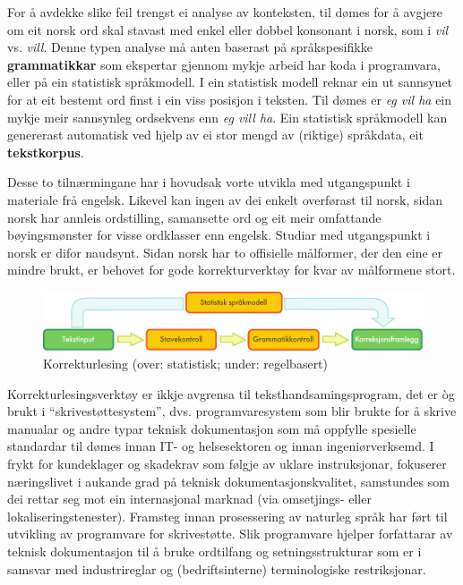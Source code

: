 \begin{multicols}{2}
For å avdekke slike feil trengst ei analyse av konteksten, til dømes for å avgjere om eit norsk ord skal stavast med enkel eller dobbel konsonant i norsk, som i \textit{vil} vs. \textit{vill}.
Denne typen analyse må anten baserast på språkspesifikke \textbf{grammatikkar} som ekspertar gjennom mykje arbeid har koda i programvara, eller på ein statistisk språkmodell. 
I ein statistisk modell reknar ein ut sannsynet for at eit bestemt ord finst i ein viss posisjon i teksten. Til dømes er \textit{eg vil ha} ein mykje meir sannsynleg ordsekvens enn \textit{eg vill ha}. Ein statistisk språkmodell kan genererast automatisk ved hjelp av ei stor mengd av (riktige) språkdata, eit \textbf{tekstkorpus}. 

Desse to tilnærmingane har i hovudsak vorte utvikla med utgangspunkt i materiale frå engelsk. Likevel kan ingen av dei enkelt overførast til norsk, sidan norsk har annleis ordstilling, samansette ord og eit meir omfattande bøyingsmønster for visse ordklasser enn engelsk. Studiar med utgangspunkt i norsk er difor naudsynt. Sidan norsk har to offisielle målformer, der den eine er mindre brukt, er behovet for gode korrekturverktøy for kvar av målformene stort. 

\begin{figure}[htb]
  \center
  \includegraphics[width=\textwidth]{../_media/norwegian-nynorsk/language_checking}
  \caption{Korrekturlesing (over: statistisk; under: regelbasert)}
  \label{fig:langcheckingaarch_no}
\end{figure}

Korrekturlesingsverktøy er ikkje avgrensa til teksthandsamingsprogram, det er òg brukt i “skrivestøttesystem”, dvs. programvaresystem som blir brukte for å skrive manualar og andre typar teknisk dokumentasjon som må oppfylle spesielle standardar til dømes innan IT- og helsesektoren og innan ingeniørverksemd. I frykt for kundeklager og skadekrav som følgje av uklare instruksjonar, fokuserer næringslivet i aukande grad på teknisk dokumentasjonskvalitet, samstundes som dei rettar seg mot ein internasjonal marknad (via omsetjings- eller lokaliseringstenester). Framsteg innan prosessering av naturleg språk har ført til utvikling av programvare for skrivestøtte. Slik programvare hjelper forfattarar av teknisk dokumentasjon til å bruke ordtilfang og setningsstrukturar som er i samsvar med industrireglar og (bedriftsinterne) terminologiske restriksjonar. 


\end{multicols}
